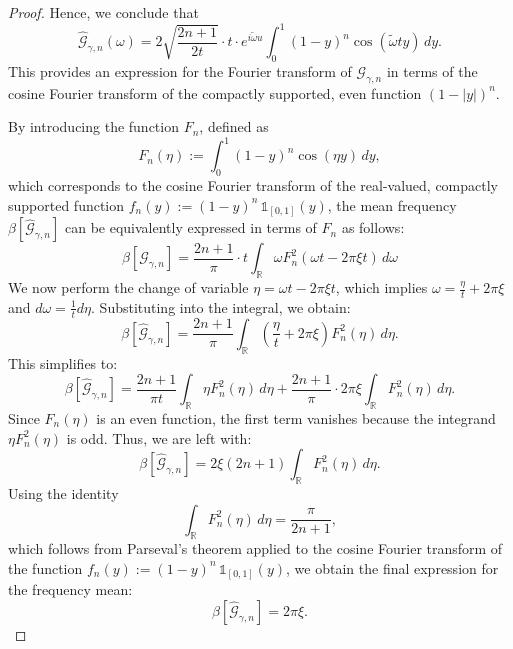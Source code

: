 \documentclass[preprint,hidelinks,authoryear]{elsarticle}
\theoremstyle{plain}
\theoremstyle{definition}
\theoremstyle{remark}
\begin{document}
\begin{proof}
Hence, we conclude that
$$
\hat{\mathcal{G}}_{\gamma,n}(\omega) = 2\sqrt{\frac{2n+1}{2t}} \cdot t \cdot e^{i \tilde{\omega} u} \int_{0}^{1} (1 - y)^n \cos(\tilde{\omega} t y) \, dy.
$$
This provides an expression for the Fourier transform of $ \mathcal{G}_{\gamma,n} $ in terms of the cosine Fourier transform of the compactly supported, even function $ (1 - |y|)^n $. 

By introducing the function $ F_n $, defined as  
\begin{equation}
\label{eq:Fn}
F_n(\eta) := \int_0^1 (1 - y)^n \cos(\eta y) \, dy,
\end{equation}
which corresponds to the cosine Fourier transform of the real-valued, compactly supported function $ f_n(y) := (1 - y)^n \, \mathds{1}_{[0,1]}(y) $, the mean frequency $ \beta[\hat{\mathcal{G}}_{\gamma,n}] $ can be equivalently expressed in terms of $ F_n $ as follows:
$$
\beta[\hat{\mathcal{G}}_{\gamma,n}] = \frac{2n+1}{\pi} \cdot t  \int_{\mathbb{R}} \omega F_n^2(\omega t-2\pi \xi t) \, d\omega
$$
We now perform the change of variable $ \eta = \omega t - 2\pi \xi t $, which implies $ \omega = \frac{\eta}{t} + 2\pi \xi $ and $ d\omega = \frac{1}{t} d\eta $. Substituting into the integral, we obtain:
$$
\beta[\hat{\mathcal{G}}_{\gamma,n}] = \frac{2n+1}{\pi} \int_{\mathbb{R}} \left( \frac{\eta}{t} + 2\pi \xi \right) F_n^2(\eta)  \, d\eta.
$$
This simplifies to:
$$
\beta[\hat{\mathcal{G}}_{\gamma,n}] = \frac{2n+1}{\pi t} \int_{\mathbb{R}} \eta F_n^2(\eta) \, d\eta + \frac{2n+1}{\pi} \cdot 2\pi \xi \int_{\mathbb{R}} F_n^2(\eta) \, d\eta.
$$
Since $ F_n(\eta) $ is an even function, the first term vanishes because the integrand $ \eta F_n^2(\eta) $ is odd. Thus, we are left with:
$$
\beta[\hat{\mathcal{G}}_{\gamma,n}] = 2\xi(2n+1) \int_{\mathbb{R}} F_n^2(\eta) \, d\eta.
$$
Using the identity  
$$
\int_{\mathbb{R}} F_n^2(\eta) \, d\eta = \frac{\pi}{2n + 1},
$$  
which follows from Parseval's theorem applied to the cosine Fourier transform of the function $ f_n(y) := (1 - y)^n \, \mathds{1}_{[0,1]}(y) $, we obtain the final expression for the frequency mean:
$$
\beta[\hat{\mathcal{G}}_{\gamma,n}] = 2\pi \xi.
$$








\end{proof}
\end{document}

